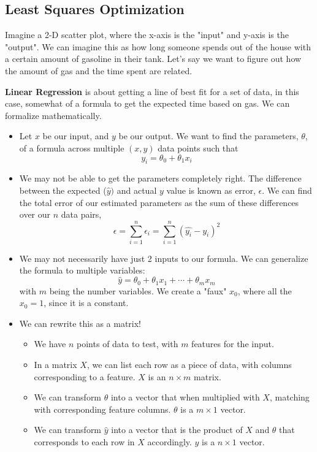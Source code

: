 \documentclass{article}
\begin{document}
\subsection{Least Squares Optimization}

Imagine a 2-D scatter plot, where the x-axis is the "input" and y-axis is the "output". We can imagine this as how long someone spends out of the house with a certain amount of gasoline in their tank. Let's say we want to figure out how the amount of gas and the time spent are related. 

\textbf{Linear Regression} is about getting a line of best fit for a set of data, in this case, somewhat of a formula to get the expected time based on gas. We can formalize mathematically.
\begin{itemize}
    \item Let $x$ be our input, and $y$ be our output. We want to find the parameters, $\theta$, of a formula across multiple $(x,y)$ data points such that
    $$y_i = \theta_0 + \theta_1x_i$$

    \item We may not be able to get the parameters completely right. The difference between the expected ($\hat{y})$ and actual $y$ value is known as error, $\epsilon$. We can find the total error of our estimated parameters as the sum of these differences over our $n$ data pairs, 
    $$\epsilon = \sum^n_{i=1} \epsilon_i = \sum^n_{i=1} (\hat{y_i} - y_i)^2$$
        
        
    \item We may not necessarily have just 2 inputs to our formula. We can generalize the formula to multiple variables:
    $$\hat{y} = \theta_0 + \theta_1 x_1 + \cdots + \theta_m x_m$$ 
    with $m$ being the number variables. We create a "faux" $x_0$, where all the $x_0 = 1$, since it is a constant. 
    
    \item We can rewrite this as a matrix! 
    \begin{itemize}
        \item We have $n$ points of data to test, with $m$ features for the input.
        \item In a matrix $X$, we can list each row as a piece of data, with columns corresponding to a feature. $X$ is an $n\times m$ matrix.
        \item We can transform $\theta$ into a vector that when multiplied with $X$, matching with corresponding feature columns. $\theta$ is a $m \times 1$ vector.
        \item We can transform $\hat{y}$ into a vector that is the product of $X$ and $\theta$ that corresponds to each row in $X$ accordingly. $\hat{y}$ is a $n \times 1$ vector.
    \end{itemize} 
    

\end{itemize}
\end{document}
